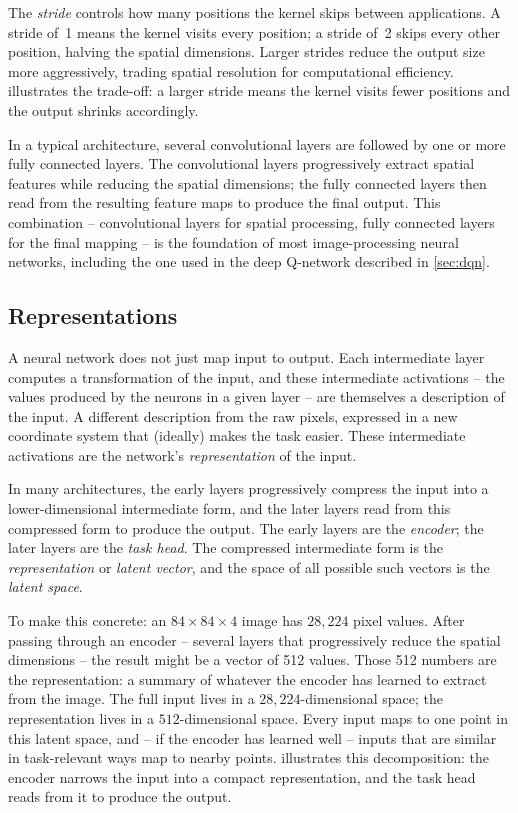 \smallskip
The \emph{stride} controls how many positions the kernel skips
between applications. A stride of~1 means the kernel visits every
position; a stride of~2 skips every other position, halving the
spatial dimensions. Larger strides reduce the output size more
aggressively, trading spatial resolution for computational
efficiency.  illustrates the trade-off: a
larger stride means the kernel visits fewer positions and the output
shrinks accordingly.



\smallskip
In a typical architecture, several convolutional layers are
followed by one or more fully connected layers. The convolutional
layers progressively extract spatial features while reducing the
spatial dimensions; the fully connected layers then read from the
resulting feature maps to produce the final output. This
combination -- convolutional layers for spatial processing, fully
connected layers for the final mapping -- is the foundation of most
image-processing neural networks, including the one used in the
deep Q-network described in \cref{sec:dqn}.

\subsection{Representations}
\label{subsec:representations}

A neural network does not just map input to output. Each
intermediate layer computes a transformation of the input, and
these intermediate activations -- the values produced by the
neurons in a given layer -- are themselves a description of the
input. A different description from the raw pixels, expressed in
a new coordinate system that (ideally) makes the task easier. These
intermediate activations are the network's \emph{representation}
of the input.

\smallskip
In many architectures, the early layers progressively compress the
input into a lower-dimensional intermediate form, and the later
layers read from this compressed form to produce the output. The
early layers are the \emph{encoder}; the later layers are the
\emph{task head}. The compressed intermediate form is the
\emph{representation} or \emph{latent vector}, and the space of
all possible such vectors is the \emph{latent space}.

\smallskip
To make this concrete: an $84 \times 84 \times 4$ image has
$28{,}224$ pixel values. After passing through an encoder -- several
layers that progressively reduce the spatial dimensions -- the
result might be a vector of 512 values. Those 512 numbers are the
representation: a summary of whatever the encoder has learned to
extract from the image. The full input lives in a $28{,}224$-dimensional
space; the representation lives in a $512$-dimensional space. Every
input maps to one point in this latent space, and -- if the encoder
has learned well -- inputs that are similar in task-relevant ways
map to nearby points.  illustrates
this decomposition: the encoder narrows the input into a compact
representation, and the task head reads from it to produce the
output.

